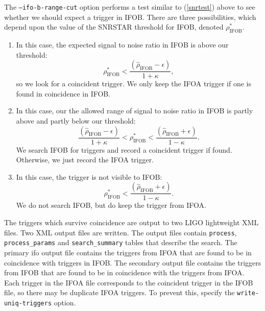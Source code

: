 \begin{entry}
The \texttt{--ifo-b-range-cut} option performs a test similar to
(\ref{snrtest}) above to see whether we should expect a trigger in
\textsc{IFOB}.  There are three possibilities, which depend upon the
value of the \textsc{SNRSTAR} threshold for \textsc{IFOB}, denoted
$\rho_\mathrm{IFOB}^{*}$.

\begin{enumerate}

\item In this case, the expected signal to noise ratio in \textsc{IFOB} is
above our threshold:
%
\begin{equation} 
  \rho_\mathrm{IFOB}^{*} < \frac{(\hat{\rho}_\mathrm{IFOB} - \epsilon)}
  {1 + \kappa} , 
\end{equation}
%
so we look for a coincident trigger.  We only keep the 
\textsc{IFOA} trigger if one is found in coincidence in \textsc{IFOB}.

\item In this case, our the allowed range of signal to noise ratio in 
\textsc{IFOB} is partly above and partly below our threshold: 
%
\begin{equation}
  \frac{(\hat{\rho}_\mathrm{IFOB} - \epsilon)} {1 + \kappa} < 
  \rho_\mathrm{IFOB}^{*} <
  \frac{(\hat{\rho}_\mathrm{IFOB} + \epsilon)} {1 - \kappa} .
\end{equation}
%
We search \textsc{IFOB} for triggers and record a coincident trigger if
found.  Otherwise, we just record the \textsc{IFOA} trigger.

\item In this case, the trigger is not visible to \textsc{IFOB}:
%
\begin{equation}
  \rho_\mathrm{IFOB}^{*} <
  \frac{(\hat{\rho}_\mathrm{IFOB} + \epsilon)} {1 - \kappa} .
\end{equation}
%
We do not search \textsc{IFOB}, but do keep the trigger from \textsc{IFOA}.


\end{enumerate}

The triggers which survive coincidence are output to two LIGO
lightweight XML files.  Two XML output files are written.  The output
files contain \texttt{process}, \texttt{process\_params} and
\texttt{search\_summary} tables that describe the search. The primary
ifo output file contains the triggers from \textsc{IFOA} that are found
to be in coincidence with triggers in \textsc{IFOB}. The secondary
output file contains the triggers from \textsc{IFOB} that are found to
be in coincidence with the triggers from \textsc{IFOA}.  Each trigger in
the \textsc{IFOA} file corresponds to the coincident trigger in the
\textsc{IFOB} file, so there may be duplicate \textsc{IFOA} triggers.
To prevent this, specify the \texttt{write-uniq-triggers} option.


\end{entry}
